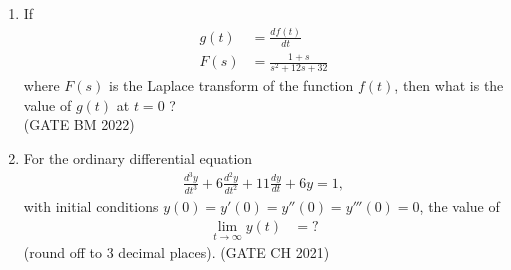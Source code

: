 \begin{enumerate}[label=\thechapter.\arabic*,ref=\thechapter.\theenumi]
\item If 
\begin{align}
 g(t) &= \frac{df(t)}{dt} \\
 F(s) &= \frac{1+s}{s^2+12s+32} 
\end{align} 
where $F(s)$ is the Laplace transform of the function $f(t)$, then what is the value of $g(t)$ at $t=0$ ?\\
\hfill(GATE BM 2022)\\
\solution

\pagebreak

\item For the ordinary differential equation
\begin{align*}
\frac{d^3y}{dt^3} + 6\frac{d^2y}{dt^2} + 11\frac{dy}{dt} + 6y = 1,
\end{align*}
with initial conditions $y(0) = y'(0) = y''(0) = y'''(0) = 0$, the value of 
\begin{align*}
\lim_{{t \to \infty}} y(t) &= ?
\end{align*}
(round off to $3$ decimal places).
\hfill(GATE CH 2021)\\
\solution

\pagebreak

\end{enumerate}
